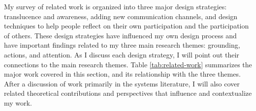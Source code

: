 My survey of related work is organized into three major design strategies: translucence and awareness, adding new communication channels, and design techniques to help people reflect on their own participation and the participation of others. These design strategies have influenced my own design process and have important findings related to my three main research themes: grounding, actions, and attention. As I discuss each design strategy, I will point out their connections to the main research themes. Table \ref{tab:related-work} summarizes the major work covered in this section, and its relationship with the three themes. After a discussion of work primarily in the systems literature, I will also cover related theoretical contributions and perspectives that influence and contextualize my work.







